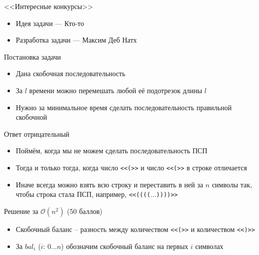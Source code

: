 \begin{frame}
  \begin{center}
    \LARGE <<Интересные конкурсы>>
  \end{center}

  \begin{itemize}
  \item Идея задачи --- Кто-то
  \item Разработка задачи --- Максим Деб Натх
  \end{itemize}

\end{frame}

\begin{frame}{Постановка задачи}

  \begin{itemize}
  \item Дана скобочная последовательность
  \item За $l$ времени можно перемешать любой её подотрезок длины $l$
  \item Нужно за минимальное время сделать последовательность правильной скобочной
  \end{itemize}
  
\end{frame}

\begin{frame}{Ответ отрицательный}
  \begin{itemize}
  \item Поймём, когда мы не можем сделать последовательность ПСП
  \item Тогда и только тогда, когда число \texttt{<<(>>} и число \texttt{<<(>>} в строке отличается
  \item Иначе всегда можно взять всю строку и переставить в ней за $n$ символы так, чтобы строка стала ПСП, например, \texttt{<<(((($\dots$))))>>}
  \end{itemize}
\end{frame}

\begin{frame}{Решение за $\mathcal{O}(n^2)$ (50 баллов)}
  \begin{itemize}
  \item Скобочный баланс -- разность между количеством \texttt{<<(>>} и количеством \texttt{<<)>>}
  \item За $bal_i$ ($i:\,0\dots n$) обозначим скобочный баланс на первых $i$ символах
  \end{itemize}
\end{frame}

